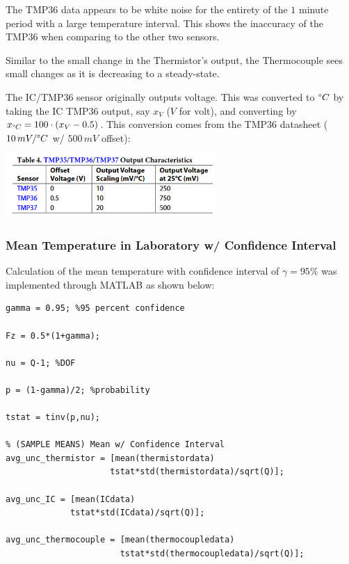 \documentclass{article}
\begin{document}
The TMP36 data appears to be white noise for the entirety of the $1$ minute period with a large temperature interval. This shows the inaccuracy of the TMP36 when comparing to the other two sensors.

Similar to the small change in the Thermistor's output, the Thermocouple sees small changes as it is decreasing to a steady-state.  

The IC/TMP36 sensor originally outputs voltage. This was converted to $\degree C$ by taking the IC TMP36 output, say $x_{V}$ ($V$ for volt), and converting by $x_{\degree C} = 100\cdot(x_{V}-0.5)$. This conversion comes from the TMP36 datasheet ($10\,mV/\degree C$ w/ $500\,mV$ offset):
\begin{center}
    \href{https://www.analog.com/media/en/technical-documentation/data-sheets/tmp35_36_37.pdf}{\includegraphics[width = 0.6\textwidth]{lab2images/tmp36_offset_documentation.png}}
\end{center}



\subsubsection{Mean Temperature in Laboratory w/ Confidence Interval}
Calculation of the mean temperature with confidence interval of $\gamma = 95\%$ was implemented through MATLAB as shown below:
\begin{lstlisting}[style=Matlab-editor]
% Confidence Interval in Laboratory
gamma = 0.95; %95 percent confidence

Fz = 0.5*(1+gamma);

nu = Q-1; %DOF

p = (1-gamma)/2; %probability

tstat = tinv(p,nu); 

% (SAMPLE MEANS) Mean w/ Confidence Interval
avg_unc_thermistor = [mean(thermistordata) 
                     tstat*std(thermistordata)/sqrt(Q)];

avg_unc_IC = [mean(ICdata) 
             tstat*std(ICdata)/sqrt(Q)];

avg_unc_thermocouple = [mean(thermocoupledata)  
                       tstat*std(thermocoupledata)/sqrt(Q)];
\end{lstlisting}
\end{document}

